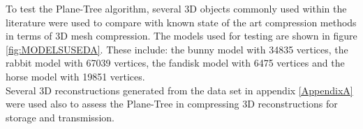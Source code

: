 To test the Plane-Tree algorithm, several 3D objects commonly used within the literature were used to compare with known state of the art compression methods in terms of 3D mesh compression. The models used for testing are shown in figure \ref{fig:MODELSUSEDA}. These include: the bunny model with 34835 vertices, the rabbit model with 67039 vertices, the fandisk model with 6475 vertices and the horse model with 19851 vertices. \\

Several 3D reconstructions generated from the data set in appendix \ref{AppendixA} were used also to assess the Plane-Tree in compressing 3D reconstructions for storage and transmission. \\

